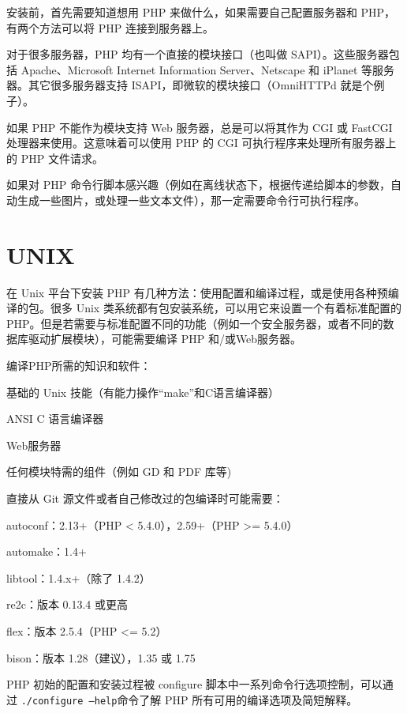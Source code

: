安装前，首先需要知道想用 PHP 来做什么，如果需要自己配置服务器和 PHP，有两个方法可以将 PHP 连接到服务器上。

对于很多服务器，PHP 均有一个直接的模块接口（也叫做 SAPI）。这些服务器包括 Apache、Microsoft Internet Information Server、Netscape 和 iPlanet 等服务器。其它很多服务器支持 ISAPI，即微软的模块接口（OmniHTTPd 就是个例子）。

如果 PHP 不能作为模块支持 Web 服务器，总是可以将其作为 CGI 或 FastCGI 处理器来使用。这意味着可以使用 PHP 的 CGI 可执行程序来处理所有服务器上的 PHP 文件请求。

如果对 PHP 命令行脚本感兴趣（例如在离线状态下，根据传递给脚本的参数，自动生成一些图片，或处理一些文本文件），那一定需要命令行可执行程序。


\section{UNIX}

在 Unix 平台下安装 PHP 有几种方法：使用配置和编译过程，或是使用各种预编译的包。很多 Unix 类系统都有包安装系统，可以用它来设置一个有着标准配置的 PHP。但是若需要与标准配置不同的功能（例如一个安全服务器，或者不同的数据库驱动扩展模块），可能需要编译 PHP 和/或Web服务器。

编译PHP所需的知识和软件：

\begin{compactitem}
\item 基础的 Unix 技能（有能力操作“make”和C语言编译器）
\item ANSI C 语言编译器
\item Web服务器
\item 任何模块特需的组件（例如 GD 和 PDF 库等)
\end{compactitem}

直接从 Git 源文件或者自己修改过的包编译时可能需要：

\begin{compactitem}
\item autoconf：2.13+（PHP < 5.4.0），2.59+（PHP >= 5.4.0）
\item automake：1.4+
\item libtool：1.4.x+（除了 1.4.2）
\item re2c：版本 0.13.4 或更高
\item flex：版本 2.5.4（PHP <= 5.2）
\item bison：版本 1.28（建议），1.35 或 1.75
\end{compactitem}

PHP 初始的配置和安装过程被 configure 脚本中一系列命令行选项控制，可以通过 \texttt{./configure --help}命令了解 PHP 所有可用的编译选项及简短解释。

